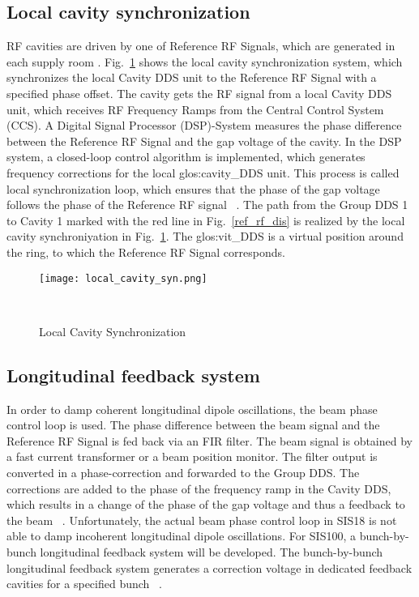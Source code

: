 \subsection{Local cavity synchronization}
RF cavities are driven by one of Reference RF Signals, which are generated in each supply room . Fig.~\ref{local_cavity_syn} shows the local cavity synchronization system, which synchronizes the local Cavity DDS unit to the Reference RF Signal with a specified phase offset. The cavity gets the RF signal from a local Cavity \gls{DDS} unit, which receives RF Frequency Ramps from the Central Control System (\gls{CCS}). A Digital Signal Processor (\gls{DSP})-System measures the phase difference between the Reference RF Signal and the gap voltage of the cavity. In the DSP system, a closed-loop control algorithm is implemented, which generates frequency corrections for the local \gls{glos:cavity_DDS} unit. This process is called local synchronization loop, which ensures that the phase of the gap voltage follows the phase of the Reference RF signal ~\cite{klingbeil_new_2011}. The path from the Group DDS 1 to Cavity 1 marked with the red line in Fig.~\ref{ref_rf_dis} is realized by the local cavity synchroniyation in Fig.~\ref{local_cavity_syn}. The \gls{glos:vit_DDS} is a virtual position around the ring, to which the Reference RF Signal corresponds.
\begin{figure}[H]
   \centering   
   \texttt{[image: local\_cavity\_syn.png]}
   \caption{Local Cavity Synchronization}{~\cite{klingbeil_new_2011}}
   \label{local_cavity_syn}
\end{figure}
\subsection{Longitudinal feedback system}
In order to damp coherent longitudinal dipole oscillations, the beam phase control loop is used. The phase difference between the beam signal and the Reference RF Signal is fed back via an FIR filter. The beam signal is obtained by a fast current transformer or a beam position monitor. The filter output is converted in a phase-correction and forwarded to the Group DDS. The corrections are added to the phase of the  frequency ramp in the Cavity DDS, which results in a change of the phase of the gap voltage and thus a feedback to the beam ~\cite{baudrenghien_low-level_2010}. Unfortunately, the actual beam phase control loop in SIS18 is not able to damp incoherent longitudinal dipole oscillations. For SIS100, a bunch-by-bunch longitudinal feedback system will be developed. The bunch-by-bunch longitudinal feedback system generates a correction voltage in dedicated feedback cavities for a specified bunch ~\cite{gross_bunch-by-bunch_2015}. 

